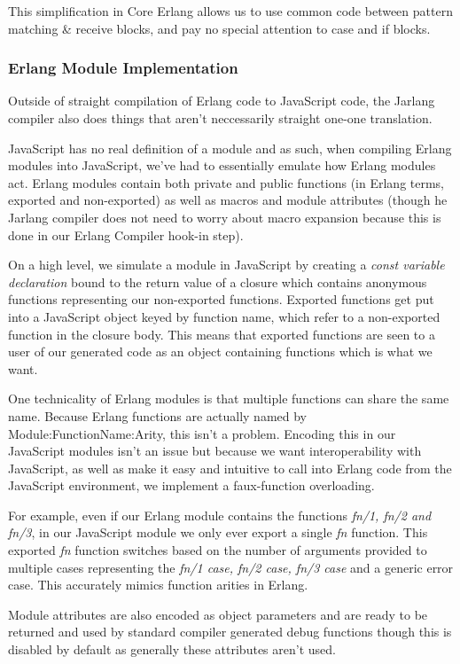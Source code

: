 \documentclass[twoside,12pt,titlepage,a4paper]{article}
\begin{document}
This simplification in Core Erlang allows us to use common code between pattern matching \& receive blocks, and pay no special attention to case and if blocks.

\subsubsection{Erlang Module Implementation} \label{sssec:num1}
Outside of straight compilation of Erlang code to JavaScript code, the Jarlang compiler also does things that aren't neccessarily straight one-one translation.

JavaScript has no real definition of a module and as such, when compiling Erlang modules into JavaScript, we've had to essentially emulate how Erlang modules act. Erlang modules contain both private and public functions (in Erlang terms, exported and non-exported) as well as macros and module attributes (though he Jarlang compiler does not need to worry about macro expansion because this is done in our Erlang Compiler hook-in step).

On a high level, we simulate a module in JavaScript by creating a \textit{const variable declaration} bound to the return value of a closure which contains anonymous functions representing our non-exported functions. Exported functions get put into a JavaScript object keyed by function name, which refer to a non-exported function in the closure body. This means that exported functions are seen to a user of our generated code as an object containing functions which is what we want.

One technicality of Erlang modules is that multiple functions can share the same name. Because Erlang functions are actually named by Module:FunctionName:Arity, this isn't a problem. Encoding this in our JavaScript modules isn't an issue but because we want interoperability with JavaScript, as well as make it easy and intuitive to call into Erlang code from the JavaScript environment, we implement a faux-function overloading.

For example, even if our Erlang module contains the functions \textit{fn/1, fn/2 and fn/3}, in our JavaScript module we only ever export a single \textit{fn} function. This exported \textit{fn} function switches based on the number of arguments provided to multiple cases representing the \textit{fn/1 case, fn/2 case, fn/3 case} and a generic error case. This accurately mimics function arities in Erlang.

Module attributes are also encoded as object parameters and are ready to be returned and used by standard compiler generated debug functions though this is disabled by default as generally these attributes aren't used.
\end{document}
